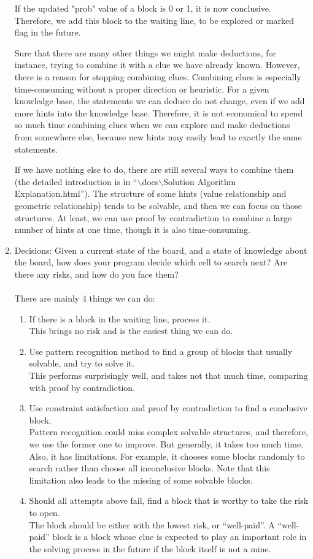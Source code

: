 \documentclass[letter]{article}
\begin{document}
\begin{enumerate}
	If the updated "prob" value of a block is 0 or 1, it is now conclusive. Therefore, we add this block to the waiting line, to be explored or marked flag in the future.
	
	Sure that there are many other things we might make deductions, for instance, trying to combine it with a clue we have already known. However, there is a reason for stopping combining clues. Combining clues is especially time-consuming without a proper direction or heuristic. For a given knowledge base, the statements we can deduce do not change, even if we add more hints into the knowledge base. Therefore, it is not economical to spend so much time combining clues when we can explore and make deductions from somewhere else, because new hints may easily lead to exactly the same statements.
	
	If we have nothing else to do, there are still several ways to combine them (the detailed introduction is in ``$\backslash$docs$\backslash$Solution Algorithm Explanation.html''). The structure of some hints (value relationship and geometric relationship) tends to be solvable, and then we can focus on those structures. At least, we can use proof by contradiction to combine a large number of hints at one time, though it is also time-consuming.
	
	\item {Decisions: Given a current state of the board, and a state of knowledge about the board, how does your program decide which cell to search next? Are there any risks, and how do you face them?} \\
	\\
	There are mainly 4 things we can do:
	\begin{enumerate}
		\item {If there is a block in the waiting line, process it. \\ This brings no risk and is the easiest thing we can do.}
		\item {Use pattern recognition method to find a group of blocks that usually solvable, and try to solve it. \\ This performs surprisingly well, and takes not that much time, comparing with proof by contradiction.}
		\item {Use constraint satisfaction and proof by contradiction to find a conclusive block. \\ Pattern recognition could miss complex solvable structures, and therefore, we use the former one to improve. But generally, it takes too much time. Also, it has limitations. For example, it chooses some blocks randomly to search rather than choose all inconclusive blocks. Note that this limitation also leads to the missing of some solvable blocks.}
		\item {Should all attempts above fail, find a block that is worthy to take the risk to open. \\ The block should be either with the lowest risk, or ``well-paid''. A ``well-paid'' block is a block whose clue is expected to play an important role in the solving process in the future if the block itself is not a mine.}
	\end{enumerate}
	

\end{enumerate}
\end{document}
